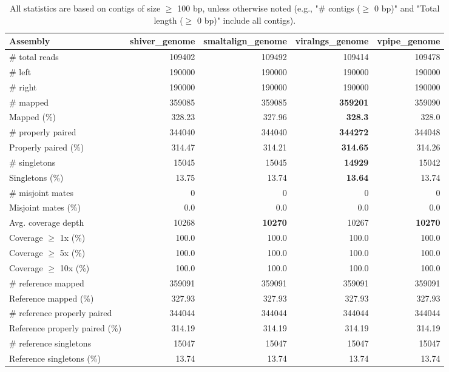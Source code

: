 \documentclass[12pt,a4paper]{article}
\begin{document}
\begin{table}[ht]
\begin{center}
\caption{All statistics are based on contigs of size $\geq$ 100 bp, unless otherwise noted (e.g., "\# contigs ($\geq$ 0 bp)" and "Total length ($\geq$ 0 bp)" include all contigs).}
\begin{tabular}{|l*{4}{|r}|}
\hline
Assembly & shiver\_genome & smaltalign\_genome & viralngs\_genome & vpipe\_genome \\ \hline
\# total reads & 109402 & 109492 & 109414 & 109478 \\ \hline
\# left & 190000 & 190000 & 190000 & 190000 \\ \hline
\# right & 190000 & 190000 & 190000 & 190000 \\ \hline
\# mapped & 359085 & 359085 & {\bf 359201} & 359090 \\ \hline
Mapped (\%) & 328.23 & 327.96 & {\bf 328.3} & 328.0 \\ \hline
\# properly paired & 344040 & 344040 & {\bf 344272} & 344048 \\ \hline
Properly paired (\%) & 314.47 & 314.21 & {\bf 314.65} & 314.26 \\ \hline
\# singletons & 15045 & 15045 & {\bf 14929} & 15042 \\ \hline
Singletons (\%) & 13.75 & 13.74 & {\bf 13.64} & 13.74 \\ \hline
\# misjoint mates & 0 & 0 & 0 & 0 \\ \hline
Misjoint mates (\%) & 0.0 & 0.0 & 0.0 & 0.0 \\ \hline
Avg. coverage depth & 10268 & {\bf 10270} & 10267 & {\bf 10270} \\ \hline
Coverage $\geq$ 1x (\%) & 100.0 & 100.0 & 100.0 & 100.0 \\ \hline
Coverage $\geq$ 5x (\%) & 100.0 & 100.0 & 100.0 & 100.0 \\ \hline
Coverage $\geq$ 10x (\%) & 100.0 & 100.0 & 100.0 & 100.0 \\ \hline
\# reference mapped & 359091 & 359091 & 359091 & 359091 \\ \hline
Reference mapped (\%) & 327.93 & 327.93 & 327.93 & 327.93 \\ \hline
\# reference properly paired & 344044 & 344044 & 344044 & 344044 \\ \hline
Reference properly paired (\%) & 314.19 & 314.19 & 314.19 & 314.19 \\ \hline
\# reference singletons & 15047 & 15047 & 15047 & 15047 \\ \hline
Reference singletons (\%) & 13.74 & 13.74 & 13.74 & 13.74 \\ \hline

\end{tabular}
\end{center}
\end{table}
\end{document}

